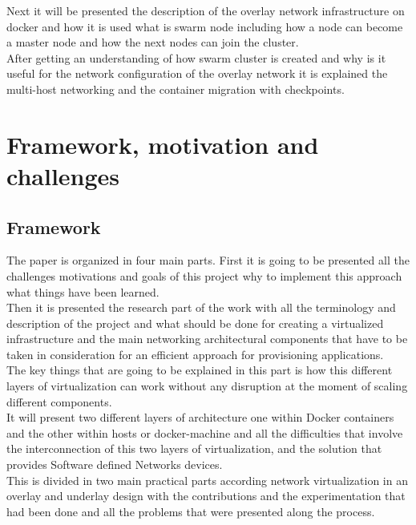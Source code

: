 Next it will be presented the description of the overlay network infrastructure on docker and how it is used what is swarm node including how a node can become a master node and how the next nodes can join the cluster.\\

After getting an understanding of how swarm cluster is created and why is it useful for the network configuration of the overlay network it is explained the multi-host networking and the container migration with checkpoints.
 
\chapter{Framework, motivation and challenges} %

\label{ch:framework, motivation and challenges}

\section{Framework}

The paper is organized in four main parts. First it is going to be presented all the challenges motivations and goals of this project why to implement this approach what things have been learned.\\
 
Then it is presented the research part of the work with all the terminology and description of the project and what should be done for creating a virtualized infrastructure and the main networking architectural components that have to be taken in consideration for an efficient approach for provisioning applications.\\

The key things that are going to be explained in this part is how this different layers of virtualization can work without any disruption at the moment of scaling different components.\\

It will present two different layers of architecture one within Docker containers and the other within hosts or docker-machine and all the difficulties that involve the interconnection of this two layers of virtualization, and the solution that provides Software defined Networks devices.\\

This is divided in two main practical parts according network virtualization in an overlay and underlay design with the contributions and the experimentation that had been done and all the problems that were presented along the process.\\
 
